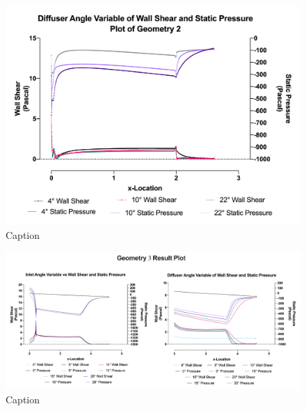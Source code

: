 \begin{figure}[!ht]
    \centering
    \includegraphics[scale=0.85]{Figures/2D_OF/2D_OF_A2_PRESS_WShear_PLOT.png}
    \caption{Caption}
    \label{fig:2D_OF_A2_PLOT}
\end{figure}

\begin{figure}[!ht]
    \centering
    \includegraphics[scale=0.85]{Figures/2D_OF/2D_OF_A3_PRESS_WShear_PLOT.png}
    \caption{Caption}
    \label{fig:2D_OF_A3_PLOT}
\end{figure}


